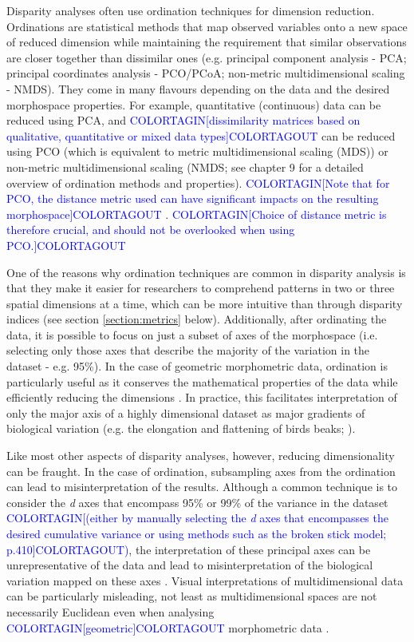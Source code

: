 \documentclass[12pt,letterpaper]{article}
\begin{document}
Disparity analyses often use ordination techniques for dimension reduction.
Ordinations are statistical methods that map observed variables onto a new space of reduced dimension while maintaining the requirement that similar observations are closer together than dissimilar ones (e.g. principal component analysis - PCA; principal coordinates analysis - PCO/PCoA; non-metric multidimensional scaling - NMDS).
They come in many flavours depending on the data and the desired morphospace properties.
For example, quantitative (continuous) data can be reduced using PCA, and \textcolor{blue}{COLORTAGIN[dissimilarity matrices based on qualitative, quantitative or mixed data types]COLORTAGOUT} can be reduced using PCO (which is equivalent to metric multidimensional scaling (MDS)) or non-metric multidimensional scaling (NMDS; see \citealt{Legendre2012} chapter 9 for a detailed overview of ordination methods and properties).
\textcolor{blue}{COLORTAGIN[Note that for PCO, the distance metric used can have significant impacts on the resulting morphospace]COLORTAGOUT} \citep{lehmann2019}. 
\textcolor{blue}{COLORTAGIN[Choice of distance metric is therefore crucial, and should not be overlooked when using PCO.]COLORTAGOUT}

One of the reasons why ordination techniques are common in disparity analysis is that they make it easier for researchers to comprehend patterns in two or three spatial dimensions at a time, which can be more intuitive than through disparity indices (see section \ref{section:metrics} below).
Additionally, after ordinating the data, it is possible to focus on just a subset of axes of the morphospace (i.e.
selecting only those axes that describe the majority of the variation in the dataset - e.g. 95\%).
In the case of geometric morphometric data, ordination is particularly useful as it conserves the mathematical properties of the data while efficiently reducing the dimensions \citep{Legendre2012,dryden2016statistical}.
In practice, this facilitates interpretation of only the major axis of a highly dimensional dataset as major gradients of biological variation (e.g. the elongation and flattening of birds beaks; \citealt{bright2016shapes}).

Like most other aspects of disparity analyses, however, reducing dimensionality can be fraught.
In the case of ordination, subsampling axes from the ordination can lead to misinterpretation of the results.
Although a common technique is to consider the \textit{d} axes that encompass 95\% or 99\% of the variance in the dataset \textcolor{blue}{COLORTAGIN[(either by manually selecting the \textit{d} axes that encompasses the desired cumulative variance or using methods such as the broken stick model; \citealt{Legendre2012} p.410]COLORTAGOUT)}, the interpretation of these principal axes can be unrepresentative of the data and lead to misinterpretation of the biological variation mapped on these axes \citep{Bookstein2015, Weisbecker2019}.
Visual interpretations of multidimensional data can be particularly misleading, not least as multidimensional spaces are not necessarily Euclidean even when analysing \textcolor{blue}{COLORTAGIN[geometric]COLORTAGOUT} morphometric data \citep{Deline2018, Gerber2017}.
\end{document}
